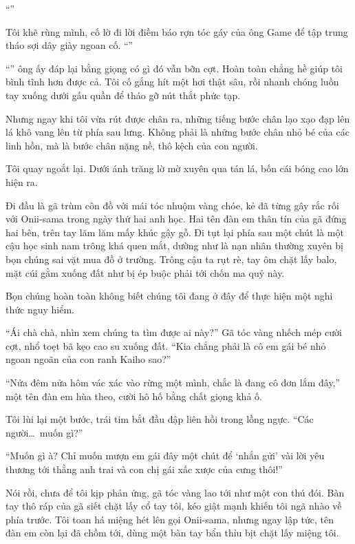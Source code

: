 \documentclass[../main.tex]{subfiles}
\begin{document}
``''

Tôi khẽ rùng mình, cố lờ đi lời điềm báo rợn tóc gáy của ông Game để tập trung tháo sợi dây giày ngoan cố. ``''

``'' ông ấy đáp lại bằng giọng có gì đó vẫn bỡn cợt. Hoàn toàn chẳng hề giúp tôi bình tĩnh hơn được cả. Tôi cố gắng hít một hơi thật sâu, rồi nhanh chóng luồn tay xuống dưới gấu quần để tháo gỡ nút thắt phức tạp.

Nhưng ngay khi tôi vừa rút được chân ra, những tiếng bước chân lạo xạo đạp lên lá khô vang lên từ phía sau lưng. Không phải là những bước chân nhỏ bé của các linh hồn, mà là bước chân nặng nề, thô kệch của con người.

Tôi quay ngoắt lại. Dưới ánh trăng lờ mờ xuyên qua tán lá, bốn cái bóng cao lớn hiện ra.

Đi đầu là gã trùm côn đồ với mái tóc nhuộm vàng chóe, kẻ đã từng gây rắc rối với Onii-sama trong ngày thứ hai anh học. Hai tên đàn em thân tín của gã đứng hai bên, trên tay lăm lăm mấy khúc gậy gỗ. Đi tụt lại phía sau một chút là một cậu học sinh nam trông khá quen mắt, dường như là nạn nhân thường xuyên bị bọn chúng sai vặt mua đồ ở trường. Trông cậu ta rụt rè, tay ôm chặt lấy balo, mặt cúi gằm xuống đất như bị ép buộc phải tới chốn ma quỷ này.

Bọn chúng hoàn toàn không biết chúng tôi đang ở đây để thực hiện một nghi thức nguy hiểm.

``Ái chà chà, nhìn xem chúng ta tìm được ai này?'' Gã tóc vàng nhếch mép cười cợt, nhổ toẹt bã kẹo cao su xuống đất. ``Kia chẳng phải là cô em gái bé nhỏ ngoan ngoãn của con ranh Kaiho sao?''

``Nửa đêm nửa hôm vác xác vào rừng một mình, chắc là đang cô đơn lắm đây,'' một tên đàn em hùa theo, cười hô hố bằng chất giọng khả ố.

Tôi lùi lại một bước, trái tim bắt đầu đập liên hồi trong lồng ngực. ``Các người\dots\ muốn gì?''

``Muốn gì à? Chỉ muốn mượn em gái đây một chút để `nhắn gửi' vài lời yêu thương tới thằng anh trai và con chị gái xấc xược của cưng thôi!''

Nói rồi, chưa để tôi kịp phản ứng, gã tóc vàng lao tới như một con thú đói. Bàn tay thô ráp của gã siết chặt lấy cổ tay tôi, kéo giật mạnh khiến tôi ngã nhào về phía trước. Tôi toan há miệng hét lên gọi Onii-sama, nhưng ngay lập tức, tên đàn em còn lại đã chồm tới, dùng một bàn tay bẩn thỉu bịt chặt lấy miệng tôi.
\end{document}
